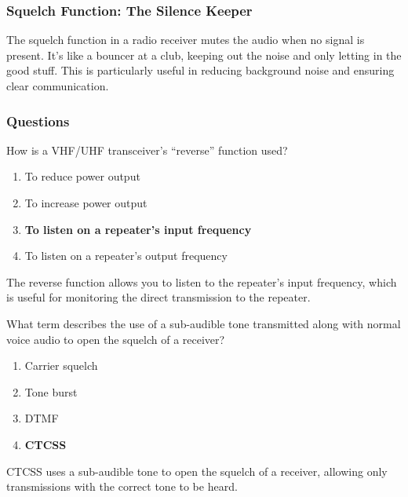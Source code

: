 \subsubsection*{Squelch Function: The Silence Keeper}
The squelch function in a radio receiver mutes the audio when no signal is present. It's like a bouncer at a club, keeping out the noise and only letting in the good stuff. This is particularly useful in reducing background noise and ensuring clear communication.

\subsubsection{Questions}

\begin{tcolorbox}[colback=gray!10!white,colframe=black!75!black,title={T2B01}]
    How is a VHF/UHF transceiver’s “reverse” function used?
    \begin{enumerate}[label=\Alph*),noitemsep]
        \item To reduce power output
        \item To increase power output
        \item \textbf{To listen on a repeater’s input frequency}
        \item To listen on a repeater’s output frequency
    \end{enumerate}
\end{tcolorbox}

The reverse function allows you to listen to the repeater's input frequency, which is useful for monitoring the direct transmission to the repeater.

\begin{tcolorbox}[colback=gray!10!white,colframe=black!75!black,title={T2B02}]
    What term describes the use of a sub-audible tone transmitted along with normal voice audio to open the squelch of a receiver?
    \begin{enumerate}[label=\Alph*),noitemsep]
        \item Carrier squelch
        \item Tone burst
        \item DTMF
        \item \textbf{CTCSS}
    \end{enumerate}
\end{tcolorbox}

CTCSS uses a sub-audible tone to open the squelch of a receiver, allowing only transmissions with the correct tone to be heard.

